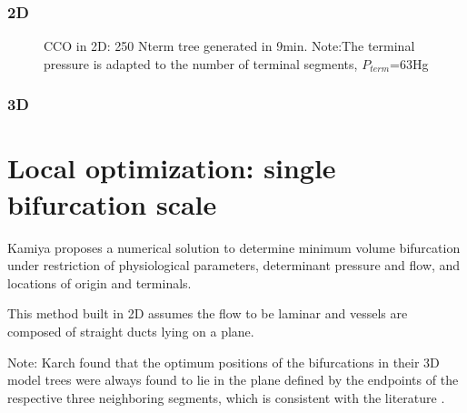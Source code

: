 \documentclass[a4paper, 11pt]{article} %
\begin{document}
\subsubsection{2D}
\begin{figure}[!h]
\centering
{}
\caption{CCO in 2D: 250 Nterm tree generated in \unit{9}{min}. Note:The terminal pressure is adapted to the number of terminal segments, $P_{term}$=\unit{63}{\milli\meter}Hg}
\label{fig:CCO 2D}
\end{figure}
\subsubsection{3D}



\section{Local optimization: single bifurcation scale}\label{Kamiya}
Kamiya proposes a numerical solution to determine minimum volume bifurcation under restriction of physiological parameters, determinant pressure and flow, and locations of origin and terminals.

This method built in 2D assumes the flow to be laminar and vessels are composed of straight ducts lying on a plane. 

Note: Karch found that the optimum positions of the bifurcations in their 3D model trees were always found to lie in the plane defined by the endpoints of the respective three neighboring segments, which is consistent with the literature \cite{zamir1986branching}. 
\end{document}
